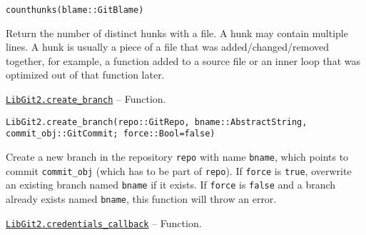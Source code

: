 \begin{adjustwidth}{2em}{0pt}


\begin{verbatim}
counthunks(blame::GitBlame)
\end{verbatim}

Return the number of distinct {\textquotedbl}hunks{\textquotedbl} with a file. A hunk may contain multiple lines. A hunk is usually a piece of a file that was added/changed/removed together, for example, a function added to a source file or an inner loop that was optimized out of that function later.



\end{adjustwidth}
\hypertarget{3632112326305021926}{} 
\hyperlink{3632112326305021926}{\texttt{LibGit2.create\_branch}}  -- {Function.}

\begin{adjustwidth}{2em}{0pt}


\begin{verbatim}
LibGit2.create_branch(repo::GitRepo, bname::AbstractString, commit_obj::GitCommit; force::Bool=false)
\end{verbatim}

Create a new branch in the repository \texttt{repo} with name \texttt{bname}, which points to commit \texttt{commit\_obj} (which has to be part of \texttt{repo}). If \texttt{force} is \texttt{true}, overwrite an existing branch named \texttt{bname} if it exists. If \texttt{force} is \texttt{false} and a branch already exists named \texttt{bname}, this function will throw an error.



\end{adjustwidth}
\hypertarget{14873190507178513691}{} 
\hyperlink{14873190507178513691}{\texttt{LibGit2.credentials\_callback}}  -- {Function.}

